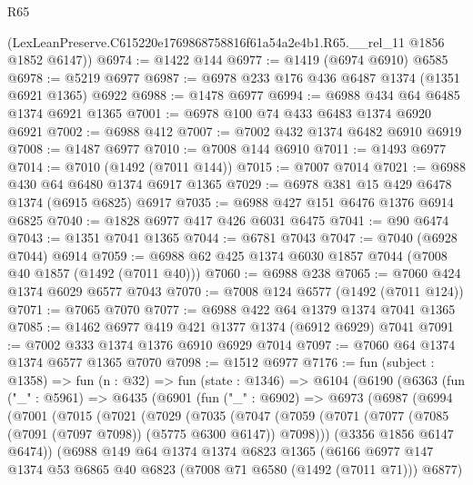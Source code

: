 \begin{lexlean}{R65}
\begin{coremodule}
      (LexLeanPreserve.C615220e1769868758816f61a54a2e4b1.R65.__rel_11 @1856 @1852 @6147))
@6974 := @1422 @144
@6977 := @1419 (@6974 @6910) @6585
@6978 := @5219 @6977
@6987 := @6978 @233 @176 @436 @6487 @1374 (@1351 @6921 @1365) @6922
@6988 := @1478 @6977
@6994 := @6988 @434 @64 @6485 @1374 @6921 @1365
@7001 := @6978 @100 @74 @433 @6483 @1374 @6920 @6921
@7002 := @6988 @412
@7007 := @7002 @432 @1374 @6482 @6910 @6919
@7008 := @1487 @6977
@7010 := @7008 @144 @6910
@7011 := @1493 @6977
@7014 := @7010 (@1492 (@7011 @144))
@7015 := @7007 @7014
@7021 := @6988 @430 @64 @6480 @1374 @6917 @1365
@7029 := @6978 @381 @15 @429 @6478 @1374 (@6915 @6825) @6917
@7035 := @6988 @427 @151 @6476 @1376 @6914 @6825
@7040 := @1828 @6977 @417 @426 @6031 @6475
@7041 := @90 @6474
@7043 := @1351 @7041 @1365
@7044 := @6781 @7043
@7047 := @7040 (@6928 @7044) @6914
@7059 := @6988 @62 @425 @1374 @6030 @1857 @7044 (@7008 @40 @1857 (@1492 (@7011 @40)))
@7060 := @6988 @238
@7065 := @7060 @424 @1374 @6029 @6577 @7043
@7070 := @7008 @124 @6577 (@1492 (@7011 @124))
@7071 := @7065 @7070
@7077 := @6988 @422 @64 @1379 @1374 @7041 @1365
@7085 := @1462 @6977 @419 @421 @1377 @1374 (@6912 @6929) @7041
@7091 := @7002 @333 @1374 @1376 @6910 @6929 @7014
@7097 := @7060 @64 @1374 @1374 @6577 @1365 @7070
@7098 := @1512 @6977
@7176 := fun (subject : @1358) =>
  fun (n : @32) =>
  fun (state : @1346) =>
  @6104
    (@6190
      (@6363
        (fun ("_" : @5961) =>
        @6435
          (@6901
            (fun ("_" : @6902) =>
            @6973
              (@6987
                (@6994
                  (@7001
                    (@7015
                      (@7021
                        (@7029
                          (@7035
                            (@7047
                              (@7059
                                (@7071
                                  (@7077 (@7085 (@7091 (@7097 @7098)) (@5775 @6300 @6147)) @7098)))
                              (@3356 @1856 @6147 @6474))
                            (@6988
                              @149
                              @64
                              @1374
                              @1374
                              @6823
                              @1365
                              (@6166
                                @6977
                                @147
                                @1374
                                @53
                                @6865
                                @40
                                @6823
                                (@7008 @71 @6580 (@1492 (@7011 @71)))
                                @6877)

\end{coremodule}
\end{lexlean}
